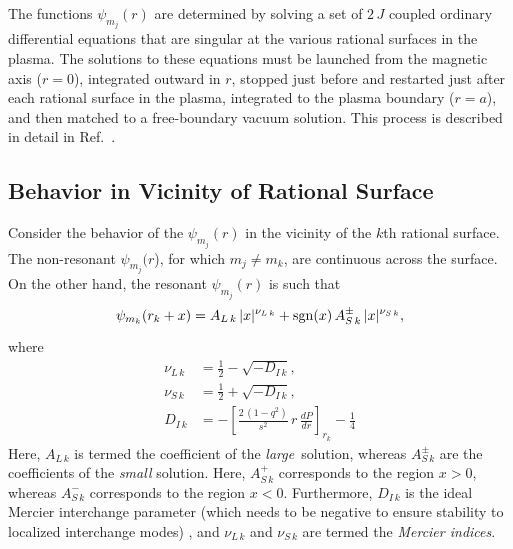 \documentclass{iopjournal}
\begin{document}
The functions $\psi_{m_j}(r)$ are determined by solving a set of $2\,J$ coupled ordinary differential equations that are singular at the
various rational surfaces in the plasma. The solutions to these equations must be launched from the magnetic axis ($r=0$), integrated outward in $r$, stopped   just before and  restarted just after each rational surface in the plasma, integrated to the plasma boundary ($r=a$), and then matched to a free-boundary vacuum
solution. This process is described in detail in Ref.~\cite{tear9}.

\subsection{Behavior in Vicinity of Rational Surface}\label{rational}
Consider the behavior of the $\psi_{m_j}(r)$ in the vicinity of the $k$th rational surface. 
The non-resonant $\psi_{m_j}(r$), for which $m_j\neq m_k$,   are continuous across the surface. On the other hand, the resonant $\psi_{m_j}(r)$ is
such that
\begin{align}\label{rat}
\psi_{m_k}(r_k+x) &= A_{L\,k}\,|x|^{\nu_{L\,k}} + {\rm sgn}(x)\,A_{S\,k}^{\pm}\,|x|^{\nu_{S\,k}},\\[0.5ex]
\end{align}
where
\begin{align}
\nu_{L\,k} &= \frac{1}{2}-\sqrt{-D_{I\,k}},\\[0.5ex]
\nu_{S\,k} &= \frac{1}{2}+\sqrt{-D_{I\,k}},\\[0.5ex]
D_{I\,k}&= - \left[\frac{2\,(1-q^2)}{s^2}\,r\,\frac{dP}{dr}\right]_{r_k} -\frac{1}{4}\label{di}
\end{align}
Here,  $A_{L\,k}$ is termed the coefficient of the {\em large}\, solution, whereas $A_{S\,k}^\pm$ are the coefficients of the {\em small}\/ solution.
Here, $A_{S\,k}^+$ corresponds to the region $x>0$, whereas  $A_{S\,k}^-$ corresponds to the region $x<0$. Furthermore, $D_{I\,k}$ is the ideal
Mercier interchange parameter (which needs to be negative to ensure stability to localized interchange modes) \cite{mercier,ggj,ggj1}, and $\nu_{L\,k}$ and $\nu_{S\,k}$
are termed the {\em Mercier indices}. 
\end{document}
